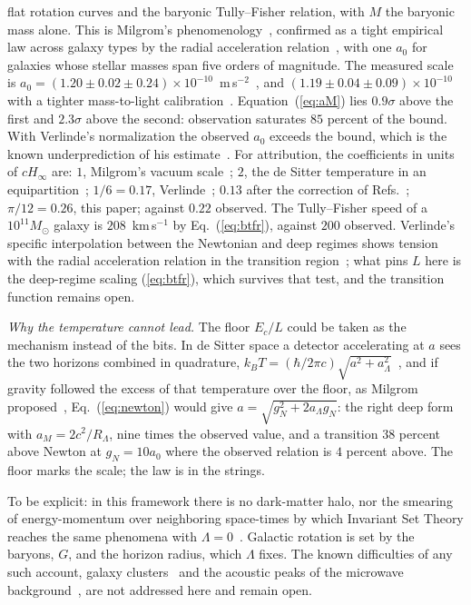 \documentclass[aps,prd,twocolumn,superscriptaddress,nofootinbib,showkeys]{revtex4-2}
\newcommand{\Ec}{E_c}
\newcommand{\RL}{R_\Lambda}
\begin{document}
flat rotation curves and the baryonic Tully--Fisher relation, with $M$ the baryonic mass alone. This is Milgrom's phenomenology~\cite{milgrom1983}, confirmed as a tight empirical law across galaxy types by the radial acceleration relation~\cite{mcgaugh2016}, with one $a_0$ for galaxies whose stellar masses span five orders of magnitude. The measured scale is $a_0 = (1.20\pm0.02\pm0.24)\times10^{-10}$~m\,s$^{-2}$~\cite{mcgaugh2016}, and $(1.19\pm0.04\pm0.09)\times10^{-10}$ with a tighter mass-to-light calibration~\cite{desmond2023}. Equation~(\ref{eq:aM}) lies $0.9\sigma$ above the first and $2.3\sigma$ above the second: observation saturates $85$ percent of the bound. With Verlinde's normalization the observed $a_0$ exceeds the bound, which is the known underprediction of his estimate~\cite{lelli2017}. For attribution, the coefficients in units of $cH_\infty$ are: $1$, Milgrom's vacuum scale~\cite{milgrom1999}; $2$, the de Sitter temperature in an equipartition~\cite{hominicng2010}; $1/6 = 0.17$, Verlinde~\cite{verlinde2017}; $0.13$ after the correction of Refs.~\cite{yoon2025,yoon2023}; $\pi/12 = 0.26$, this paper; against $0.22$ observed. The Tully--Fisher speed of a $10^{11}M_\odot$ galaxy is $208$~km\,s$^{-1}$ by Eq.~(\ref{eq:btfr}), against $200$ observed. Verlinde's specific interpolation between the Newtonian and deep regimes shows tension with the radial acceleration relation in the transition region~\cite{lelli2017}; what pins $L$ here is the deep-regime scaling (\ref{eq:btfr}), which survives that test, and the transition function remains open.

\textit{Why the temperature cannot lead.} The floor $\Ec/L$ could be taken as the mechanism instead of the bits. In de Sitter space a detector accelerating at $a$ sees the two horizons combined in quadrature, $k_BT = (\hbar/2\pi c)\sqrt{a^2 + a_\Lambda^2}$~\cite{deser1997}, and if gravity followed the excess of that temperature over the floor, as Milgrom proposed~\cite{milgrom1999}, Eq.~(\ref{eq:newton}) would give $a = \sqrt{g_N^2 + 2a_\Lambda g_N}$: the right deep form with $a_M = 2c^2/\RL$, nine times the observed value, and a transition $38$ percent above Newton at $g_N = 10a_0$ where the observed relation is $4$ percent above. The floor marks the scale; the law is in the strings.

To be explicit: in this framework there is no dark-matter halo, nor the smearing of energy-momentum over neighboring space-times by which Invariant Set Theory reaches the same phenomena with $\Lambda = 0$~\cite{palmer2016,hance2025}. Galactic rotation is set by the baryons, $G$, and the horizon radius, which $\Lambda$ fixes. The known difficulties of any such account, galaxy clusters~\cite{clowe2006} and the acoustic peaks of the microwave background~\cite{planck2018}, are not addressed here and remain open.
\end{document}
